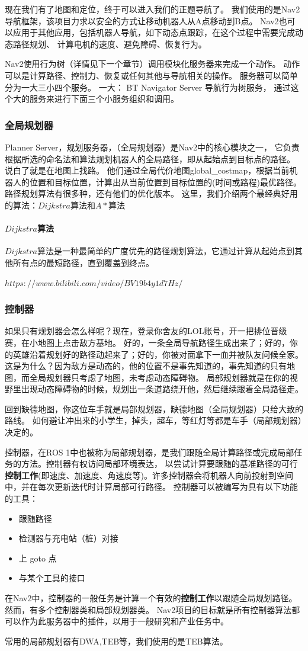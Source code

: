 现在我们有了地图和定位，终于可以进入我们的正题导航了。
我们使用的是Nav2导航框架，该项目力求以安全的方式让移动机器人从A点移动到B点。
Nav2也可以应用于其他应用，包括机器人导航，如下动态点跟踪，在这个过程中需要完成动态路径规划、
计算电机的速度、避免障碍、恢复行为。

Nav2使用行为树（详情见下一个章节）调用模块化服务器来完成一个动作。
动作可以是计算路径、控制力、恢复或任何其他与导航相关的操作。
服务器可以简单分为一大三小四个服务。
一大：
BT Navigator Server 导航行为树服务，
通过这个大的服务来进行下面三个小服务组织和调用。
\subsubsection{全局规划器}

Planner Server，规划服务器，（全局规划器）是Nav2中的核心模块之一，
它负责根据所选的命名法和算法规划机器人的全局路径，即从起始点到目标点的路径。
说白了就是在地图上找路。
他们通过全局代价地图global\_costmap，根据当前机器人的位置和目标位置，计算出从当前位置到目标位置的(时间或路程)最优路径。
路径规划算法有很多种，还有他们的优化版本。
这里，我们介绍两个最经典好用的算法：$Dijkstra$算法和$A*$算法
\paragraph{$Dijkstra$算法}
$Dijkstra$算法是一种最简单的广度优先的路径规划算法，它通过计算从起始点到其他所有点的最短路径，直到覆盖到终点。

$https://www.bilibili.com/video/BV19b4y1d7Hz/$


\subsubsection{控制器}
如果只有规划器会怎么样呢？现在，登录你舍友的LOL账号，开一把排位晋级赛，在小地图上点击敌方基地。
好的，一条全局导航路径生成出来了；好的，你的英雄沿着规划好的路径动起来了；好的，你被对面拿下一血并被队友问候全家。
这是为什么？因为敌方是动态的，他的位置不是事先知道的，事先知道的只有地图，而全局规划器只考虑了地图，未考虑动态障碍物。
局部规划器就是在你的视野里出现动态障碍物的时候，规划出一条道路绕开他，然后继续跟着全局路径走。

回到缺德地图，你这位车手就是局部规划器，缺德地图（全局规划器）只给大致的路线。
如何避让冲出来的小学生，掉头，超车，等红灯等都是车手（局部规划器）决定的。

控制器，在ROS 1中也被称为局部规划器，是我们跟随全局计算路径或完成局部任务的方法。控制器有权访问局部环境表达，
以尝试计算要跟随的基准路径的可行\textbf{控制工作}(即速度、加速度、角速度等)。许多控制器会将机器人向前投射到空间中，并在每次更新迭代时计算局部可行路径。
控制器可以被编写为具有以下功能的工具：
\begin{itemize}
    \item 跟随路径
    \item 检测器与充电站（桩）对接
    \item 上 goto 点
    \item 与某个工具的接口
\end{itemize}
在Nav2中，控制器的一般任务是计算一个有效的\textbf{控制工作}以跟随全局规划路径。
然而，有多个控制器类和局部规划器类。
Nav2项目的目标就是所有控制器算法都可以作为此服务器中的插件，以用于一般研究和产业任务中。

常用的局部规划器有DWA,TEB等，我们使用的是TEB算法。